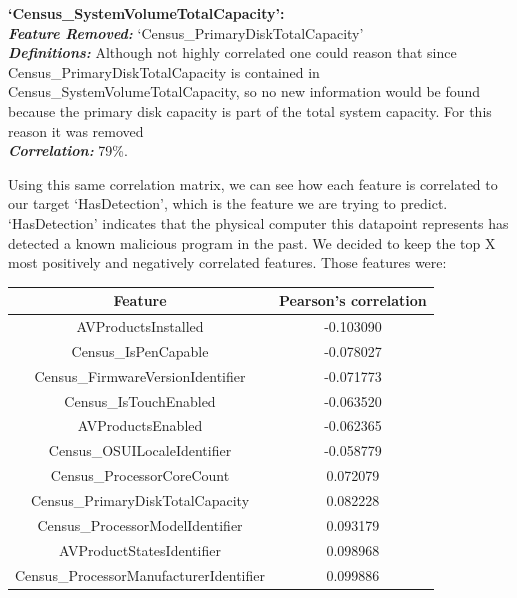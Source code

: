 \documentclass[sigconf]{acmart}
\begin{document}
\begin{center}
    \vspace{5mm}
\textbf{`Census\_SystemVolumeTotalCapacity':}\\
    \textbf{\textit{Feature Removed: }}`Census\_PrimaryDiskTotalCapacity'\\
    \textbf{\textit{Definitions:}} Although not highly correlated one could reason that since Census\_PrimaryDiskTotalCapacity  is contained in Census\_SystemVolumeTotalCapacity, so no new information would be found because the primary disk capacity is part of the total system capacity. For this reason it was removed\\
    \textbf{\textit{Correlation: }}79\%.\\
    \vspace{5mm}
\end{center}

Using this same correlation matrix, we can see how each feature is correlated to our target `HasDetection’, which is the feature we are trying to predict. `HasDetection' indicates that the physical computer this datapoint represents has detected a known malicious program in the past. We decided to keep the top X most positively and negatively correlated features. Those features were:

\begin{center}
\begin{tabular}{ |c|c| } 
 \hline
 Feature & Pearson's correlation \\
  \hline\hline
 AVProductsInstalled & -0.103090 \\
  \hline
Census\_IsPenCapable & -0.078027 \\
 \hline
Census\_FirmwareVersionIdentifier & -0.071773 \\
 \hline
Census\_IsTouchEnabled & -0.063520 \\
 \hline
AVProductsEnabled & -0.062365 \\
 \hline
Census\_OSUILocaleIdentifier & -0.058779 \\
 \hline
Census\_ProcessorCoreCount & 0.072079 \\
 \hline
Census\_PrimaryDiskTotalCapacity & 0.082228 \\
 \hline
Census\_ProcessorModelIdentifier & 0.093179 \\
 \hline
AVProductStatesIdentifier & 0.098968 \\
 \hline
Census\_ProcessorManufacturerIdentifier & 0.099886 \\
 \hline
\end{tabular}
\end{center}
\vspace{3mm}
\end{document}
